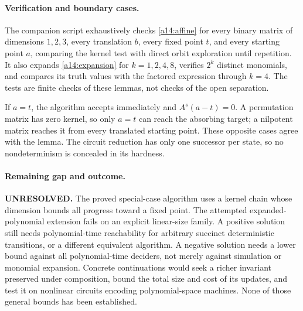 \documentclass[11pt]{article}
\begin{document}
\paragraph{Verification and boundary cases.}
The companion script exhaustively checks \eqref{a14:affine} for every binary
matrix of dimensions $1,2,3$, every translation $b$, every fixed point $t$,
and every starting point $a$, comparing the kernel test with direct orbit
exploration until repetition. It also expands \eqref{a14:expansion} for
$k=1,2,4,8$, verifies $2^k$ distinct monomials, and compares its truth values
with the factored expression through $k=4$. The tests are finite checks of
these lemmas, not checks of the open separation.

If $a=t$, the algorithm accepts immediately and $A^s(a-t)=0$. A permutation
matrix has zero kernel, so only $a=t$ can reach the absorbing target; a
nilpotent matrix reaches it from every translated starting point. These
opposite cases agree with the lemma. The circuit reduction has only one
successor per state, so no nondeterminism is concealed in its hardness.

\paragraph{Remaining gap and outcome.}
\textbf{UNRESOLVED.} The proved special-case algorithm uses a kernel chain
whose dimension bounds all progress toward a fixed point. The attempted
expanded-polynomial extension fails on an explicit linear-size family.
A positive solution still needs polynomial-time reachability for arbitrary
succinct deterministic transitions, or a different equivalent algorithm.
A negative solution needs a lower bound against all polynomial-time deciders,
not merely against simulation or monomial expansion. Concrete continuations
would seek a richer invariant preserved under composition, bound the total
size and cost of its updates, and test it on nonlinear circuits encoding
polynomial-space machines. None of those general bounds has been established.
\end{document}
